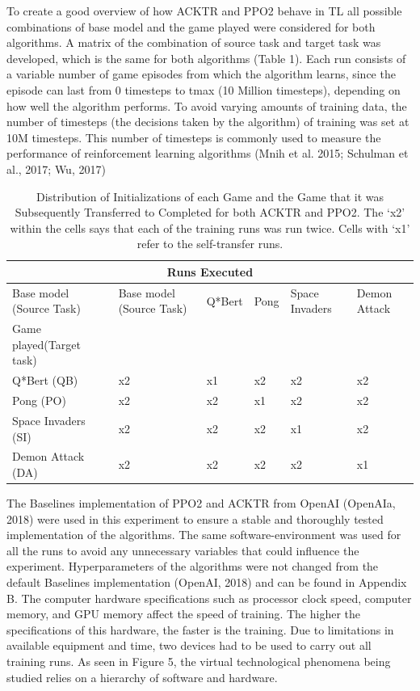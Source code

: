 To create a good overview of how ACKTR and PPO2 behave in TL all possible combinations of base model and the game played were considered for both algorithms. A matrix of the combination of source task and target task was developed, which is the same for both algorithms (Table 1). Each run consists of a variable number of game episodes from which the algorithm learns, since the episode can last from 0 timesteps to tmax (10 Million timesteps), depending on how well the algorithm performs. To avoid varying amounts of training data, the number of timesteps (the decisions taken by the algorithm) of training was set at 10M timesteps. This number of timesteps is commonly used to measure the performance of reinforcement learning algorithms (Mnih et al. 2015; Schulman et al., 2017; Wu, 2017) 
\begin{table}[]
	\begin{tabular}{llllll}
		\hline
		\multicolumn{6}{c}{Runs Executed}                                                                   \\ \hline
		Base model (Source Task) & Base model (Source Task) & Q*Bert & Pong & Space Invaders & Demon Attack \\
		Game played(Target task) &                          &        &      &                &              \\
		Q*Bert (QB)              & x2                       & x1     & x2   & x2             & x2           \\
		Pong (PO)                & x2                       & x2     & x1   & x2             & x2           \\
		Space Invaders (SI)      & x2                       & x2     & x2   & x1             & x2           \\
		Demon Attack (DA)        & x2                       & x2     & x2   & x2             & x1           \\ \hline
	\end{tabular}
	\caption{Distribution of Initializations of each Game and the Game that it was Subsequently Transferred to Completed for both ACKTR and PPO2. The ‘x2’ within the cells says that each of the training runs was run twice. Cells with ‘x1’ refer to the self-transfer runs.}
\end{table}

The Baselines implementation of PPO2 and ACKTR from OpenAI (OpenAIa, 2018) were used in this experiment to ensure a stable and thoroughly tested implementation of the algorithms. 
The same software-environment was used for all the runs to avoid any unnecessary variables that could influence the experiment.
Hyperparameters of the algorithms were not changed from the default Baselines implementation (OpenAI, 2018) and can be found in Appendix B. The computer hardware specifications such as processor clock speed, computer memory, and GPU memory affect the speed of training. The higher the specifications of this hardware, the faster is the training. Due to limitations in available equipment and time, two devices had to be used to carry out all training runs. As seen in Figure 5, the virtual technological phenomena being studied relies on a hierarchy of software and hardware. 

